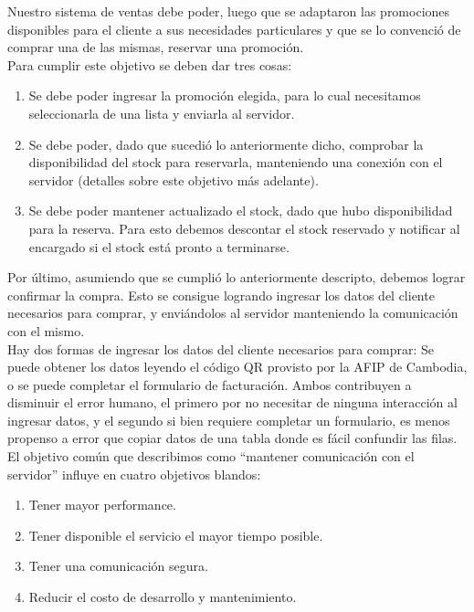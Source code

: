 \indent Nuestro sistema de ventas debe poder, luego que se adaptaron las promociones disponibles para el cliente a sus necesidades particulares y que se lo convenció de comprar una de las mismas, reservar una promoción.\\
\indent Para cumplir este objetivo se deben dar tres cosas:
\begin{enumerate}
  \item Se debe poder ingresar la promoción elegida, para lo cual necesitamos seleccionarla de una lista y enviarla al servidor.
  \item Se debe poder, dado que sucedió lo anteriormente dicho, comprobar la disponibilidad del stock para reservarla, manteniendo una conexión con el servidor (detalles sobre este objetivo más adelante).
  \item Se debe poder mantener actualizado el stock, dado que hubo disponibilidad para la reserva. Para esto debemos descontar el stock reservado y notificar al encargado si el stock está pronto a terminarse.
\end{enumerate}

\indent Por último, asumiendo que se cumplió lo anteriormente descripto, debemos lograr confirmar la compra. Esto se consigue logrando ingresar los datos del cliente necesarios para comprar, y enviándolos al servidor manteniendo la comunicación con el mismo.\\
\indent Hay dos formas de ingresar los datos del cliente necesarios para comprar: Se puede obtener los datos leyendo el código QR provisto por la AFIP de Cambodia, o se puede completar el formulario de facturación. Ambos contribuyen a disminuir el error humano, el primero por no necesitar de ninguna interacción al ingresar datos, y el segundo si bien requiere completar un formulario, es menos propenso a error que copiar datos de una tabla donde es fácil confundir las filas.\\

\indent El objetivo común que describimos como ``mantener comunicación con el servidor'' influye en cuatro objetivos blandos:
\begin{enumerate}
  \item Tener mayor performance.
  \item Tener disponible el servicio el mayor tiempo posible.
  \item Tener una comunicación segura.
  \item Reducir el costo de desarrollo y mantenimiento.
\end{enumerate}

